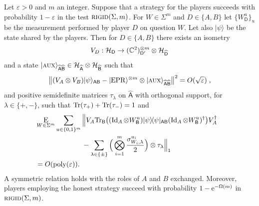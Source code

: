 \documentclass{toc}
\newcommand{\ket}[1]{|#1\rangle}
\newcommand{\bra}[1]{\langle#1|}
\newcommand{\proj}[1]{\ket{#1}\!\bra{#1}}
\newcommand{\Tr}{\mbox{\rm Tr}}
\newcommand{\Id}{\ensuremath{\mathop{\rm Id}\nolimits}}
\DeclareMathOperator{\poly}{poly}
\newcommand{\reg}[1]{{\textsf{#1}}}
\newcommand{\mH}{\mathcal{H}}
\newcommand{\eps}{\varepsilon}
\newcommand{\EPR}{{\rm EPR}}
\newcommand{\aux}{\textsc {aux}}
\newcommand{\rigid}{\textsc{rigid}}
\begin{document}
\begin{theorem}\label{thm:clifford-rigid}
Let $\eps>0$ and $m$ an integer. Suppose that a strategy for the players succeeds with probability $1-\eps$ in the test $\rigid(\Sigma,m)$. 
For $W\in\Sigma^m$ and $D\in\{A,B\}$ let $\{W^u_\reg{D}\}_u$ be the measurement performed by player $D$ on question $W$. Let also $\ket{\psi}$ be the state shared by the players.
Then for $D\in\{A,B\}$ there exists an isometry 
$$V_D: \mathcal{H}_\reg{D} \to (\C^2)^{\otimes m}_{\reg{D}'} \otimes {\mH}_{\widehat{\reg{D}}}$$
and a state  $\ket{\aux}_{\widehat{\reg{A}}\widehat{\reg{B}}} \in {\mH}_{\widehat{\reg{A}}}\otimes {\mH}_{\widehat{\reg{B}}}$
such that
\begin{equation}\label{eq:clifford-rigid-statement-1}
 \big\| (V_A \otimes V_B) \ket{\psi}_{\reg{AB}}  - \ket{\EPR}^{\otimes m} \otimes \ket{\aux}_{\widehat{\reg{A}}\widehat{\reg{B}}} \big\|^2 = O(\sqrt{\eps})\;,
\end{equation}
and positive semidefinite matrices $\tau_\lambda$ on $\widehat{\reg{A}}$ with orthogonal support, for $\lambda\in\{+,-\}$, such that $\Tr(\tau_+)+\Tr(\tau_-)=1$ and
\begin{align}
  &\mathop{\textsc{E}}_{W\in\Sigma^m} \sum_{u\in\{0,1\}^{m}} \Big\|V_A
  \Tr_{\reg{B}}\big((\Id_A \otimes W_{\reg{B}}^u) \proj{\psi}_{\reg{AB}} (\Id_A
  \otimes W_{\reg{B}}^u)^\dagger\big) V_A^\dagger \notag\\
  &\;\;\;\;\;\;\;\;\;\;\;\;\;\;\;\;\;\;\;\;\;\;\;\;- \sum_{\lambda\in\{\pm\}} \Big( \bigotimes_{i=1}^m \frac{\sigma_{W_{i},\lambda}^{u_{i}}}{2}\Big)\otimes \tau_\lambda  \Big\|_1\notag\\
  &= O(\poly(\eps)).&\label{eq:rigid-4}
\end{align}
A symmetric relation holds with the roles of $A$ and $B$ exchanged. 
Moreover, players employing the honest strategy succeed with probability
$1-\mathrm e^{-\Omega(m)}$ in $\rigid(\Sigma,m)$.  
\end{theorem}
\end{document}
